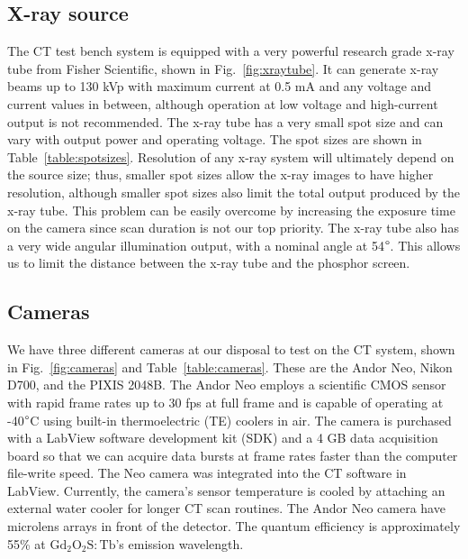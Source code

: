 \subsection{X-ray source}
The CT test bench system is equipped with a very powerful research grade x-ray tube from Fisher Scientific, shown in Fig.~\ref{fig:xraytube}.  It can generate x-ray beams up to 130 kVp with maximum current at 0.5 mA and any voltage and current values in between, although operation at low voltage and high-current output is not recommended.  The x-ray tube has a very small spot size and can vary with output power and operating voltage.  The spot sizes are shown in Table~\ref{table:spotsizes}.  Resolution of any x-ray system will ultimately depend on the source size; thus, smaller spot sizes allow the x-ray images to have higher resolution, although smaller spot sizes also limit the total output produced by the x-ray tube.  This problem can be easily overcome by increasing the exposure time on the camera since scan duration is not our top priority.  The x-ray tube also has a very wide angular illumination output, with a nominal angle at 54$\degree$.  This allows us to limit the distance between the x-ray tube and the phosphor screen.
%
\begin{figure}
\begin{floatrow}
\end{floatrow}
\end{figure}

\subsection{Cameras}
We have three different cameras at our disposal to test on the CT system, shown in Fig.~\ref{fig:cameras} and Table~\ref{table:cameras}.  These are the Andor Neo, Nikon D700, and the PIXIS 2048B.  The Andor Neo employs a scientific CMOS sensor with rapid frame rates up to 30 fps at full frame and is capable of operating at -40$\degree$C using built-in thermoelectric (TE) coolers in air.  The camera is purchased with a LabView software development kit (SDK) and a 4 GB data acquisition board so that we can acquire data bursts at frame rates faster than the computer file-write speed.  The Neo camera was integrated into the CT software in LabView.  Currently, the camera's sensor temperature is cooled by attaching an external water cooler for longer CT scan routines.  The Andor Neo camera have microlens arrays in front of the detector.  The quantum efficiency is approximately 55\% at $\mathrm{Gd_2O_2S:Tb}$'s emission wavelength.

